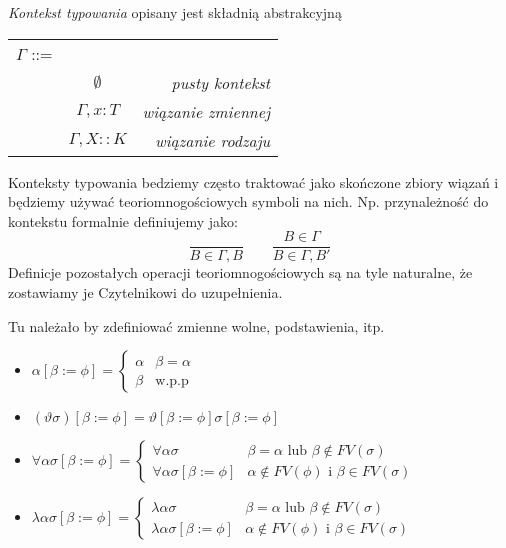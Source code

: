 \documentclass[11pt,leqno]{article}
\begin{document}
\begin{definicja}
	\emph{Kontekst typowania} opisany jest składnią abstrakcyjną
	
	\begin{tabular}{ | l c r | }
		\hline
		$\Gamma$ ::= & & \\
		& $\emptyset$ & \textit{pusty kontekst} \\
		& $\Gamma,x:T$& \textit{wiązanie zmiennej} \\ 
		& $\Gamma,X::K$& \textit{wiązanie rodzaju} \\ 
		\hline
	\end{tabular}
	
	Konteksty typowania bedziemy często traktować jako skończone zbiory wiązań i będziemy
	używać teoriomnogościowych symboli na nich. Np. przynależność do kontekstu formalnie
	definiujemy jako:
	\[
		\frac{}{B \in \Gamma,B}
		\qquad
		\frac{B \in \Gamma}{B \in \Gamma,B'}
	\]
	Definicje pozostałych operacji teoriomnogościowych są na tyle naturalne, że zostawiamy
	je Czytelnikowi do uzupełnienia.
\end{definicja}

\begin{definicja}
Tu należało by zdefiniować zmienne wolne, podstawienia, itp.
    \begin{itemize}
        \item $\alpha [\beta := \phi]= \begin{cases}  \alpha & \beta=\alpha \\ \beta & \text{w.p.p} \end{cases}$
        \item $(\vartheta \sigma) [\beta := \phi] = \vartheta [\beta := \phi] \sigma [\beta := \phi]$
        \item $\forall \alpha \sigma [\beta := \phi]= \begin{cases} \forall \alpha \sigma & \beta=\alpha \text{ lub } \beta \notin FV(\sigma)\\ \forall \alpha \sigma [\beta := \phi] & \alpha \notin FV(\phi)  \text{ i } \beta \in FV(\sigma) \end{cases}$
        \item $\lambda \alpha \sigma [\beta := \phi]= \begin{cases} \lambda \alpha \sigma & \beta=\alpha \text{ lub } \beta \notin FV(\sigma)\\ \lambda \alpha \sigma [\beta := \phi] & \alpha \notin FV(\phi)  \text{ i } \beta \in FV(\sigma) \end{cases}$
    \end{itemize}
\end{definicja}
\end{document}
